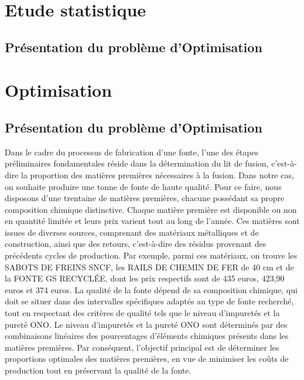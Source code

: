 \documentclass[12pt]{article}
\begin{document}
    


\section{Etude statistique }

\subsection{Présentation du problème d'Optimisation }



\section{Optimisation}

\subsection{Présentation du problème d'Optimisation }

Dans le cadre du processus de fabrication d'une fonte, l'une des étapes préliminaires fondamentales
réside dans la détermination du lit de fusion, c'est-à-dire la proportion des matières premières
nécessaires à la fusion. Dans notre cas, on souhaite  produire une tonne de fonte de haute qualité.
Pour ce faire, nous disposons d'une trentaine de matières premières, chacune possédant sa propre
composition chimique distinctive. Chaque matière première est disponible ou non en quantité limitée
et leurs prix varient tout au long de l'année. Ces matières sont issues de diverses sources,
comprenant des matériaux métalliques et de construction, ainsi que des retours, c'est-à-dire
des résidus provenant des précédents cycles de production. Par exemple, parmi ces matériaux,
on trouve les SABOTS DE FREINS SNCF, les RAILS DE CHEMIN DE FER de 40 cm et de la FONTE GS RECYCLÉE,
dont les prix respectifs sont de 435 euros, 423,90 euros et 374 euros. La qualité de la fonte dépend
de sa composition chimique, qui doit se situer dans des intervalles spécifiques adaptés au type
de fonte recherché, tout en respectant des critères de qualité tels que le niveau d'impuretés et
la pureté ONO. Le niveau d'impuretés et la pureté ONO sont déterminés par des combinaisons linéaires
des pourcentages d'éléments chimiques présents dans les matières premières. Par conséquent,
l'objectif principal est de déterminer les proportions optimales des matières premières,
en vue de minimiser les coûts de production tout en préservant la qualité de la fonte.
\end{document}
